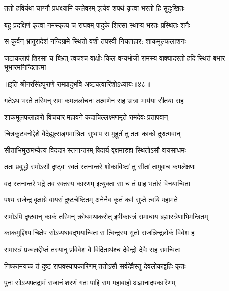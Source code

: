 \twolineshloka
{ततो हविर्यथा चाग्नौ प्रधक्ष्यामि कलेवरम्}
{इत्येवं शपथं कृत्वा भरतो हि सुदुःखितः} %

\twolineshloka
{बहु प्रदक्षिणं कृत्वा नमस्कृत्य च राघवम्}
{पादुके शिरसा स्थाप्य भरतः प्रस्थितः शनैः} %

\twolineshloka
{स कुर्वन् भ्रातुरादेशं नन्दिग्रामे स्थितो वशी}
{तपस्वी नियताहार: शाकमूलफलाशनः} %

\fourlineindentedshloka
{जटाकलापं शिरसा च बिभ्रत्}
{त्वचश्च वाक्षीः किल वन्यभोजी}
{रामस्य वाक्यादरतो हदि स्थितं}
{बभार भूभारमनिन्दितात्मा} %

॥इति श्रीनरसिंहपुराणे रामप्रादुर्भावे अष्टचत्वारिंशोऽध्यायः॥४८॥



\twolineshloka
{गतेऽथ भरते तस्मिन् रामः कमललोचनः}
{लक्ष्मणेन सह भ्रात्रा भार्यया सीतया सह} %

\twolineshloka
{शाकमूलफलाहारो विचचार महावने}
{कदाचिल्लक्ष्मणमृते रामदेवः प्रतापवान्} %

\twolineshloka
{चित्रकूटवनोद्देशे वैदेह्युत्सङ्गमाश्रितः}
{सुष्वाप स मुहूर्तं तु ततः काको दुरात्मवान्} %

\twolineshloka
{सीताभिमुखमभ्येत्य विददार स्तनान्तरम्}
{विदार्य वृक्षमारुह्य स्थितोऽसौ वायसाधमः} %

\twolineshloka
{ततः प्रबुद्धो रामोऽसौ दृष्ट्वा रक्तं स्तनान्तरे}
{शोकाविष्टां तु सीतां तामुवाच कमलेक्षणः} %

\twolineshloka
{वद स्तनान्तरे भद्रे तव रक्तस्य कारणम्}
{इत्युक्ता सा च तं प्राह भर्तारं विनयान्विता} %

\twolineshloka
{पश्य राजेन्द्र वृक्षाग्रे वायसं दुष्टचेष्टितम्}
{अनेनैव कृतं कर्म सुप्ते त्वयि महामते} %

\twolineshloka
{रामोऽपि दृष्टवान् काकं तस्मिन् क्रोधमथाकरोत्}
{इषीकास्त्रं समाधाय ब्रह्मास्त्रेणाभिमन्त्रितम्} %

\twolineshloka
{काकमुद्दिश्य चिक्षेप सोऽप्यधावद्भयान्वितः}
{स त्विन्द्रस्य सुतो राजन्निन्द्रलोकं विवेश ह} %

\twolineshloka
{रामास्त्रं प्रज्वलद्दीप्तं तस्यानु प्रविवेश वै}
{विदितार्थश्च देवेन्द्रो देवैः सह समन्वितः} %

\twolineshloka
{निष्क्रामयच्च तं दुष्टं राघवस्यापकारिणम्}
{ततोऽसौ सर्वदेवैस्तु देवलोकाद्वहिः कृतः} %

\twolineshloka
{पुनः सोऽप्यपतद्रामं राजानं शरणं गतः}
{पाहि राम महाबाहो अज्ञानादपकारिणम्} %

